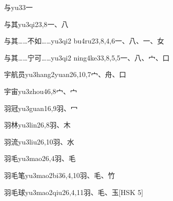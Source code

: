 \begin{entry}{与}{yu3}{3}{⼀}
\end{entry}

\begin{entry}{与其}{yu3qi2}{3,8}{⼀、⼋}
\end{entry}

\begin{entry}{与其……不如……}{yu3qi2 bu4ru2}{3,8,4,6}{⼀、⼋、⼀、⼥}
\end{entry}

\begin{entry}{与其……宁可……}{yu3qi2 ning4ke3}{3,8,5,5}{⼀、⼋、⼧、⼝}
\end{entry}

\begin{entry}{宇航员}{yu3hang2yuan2}{6,10,7}{⼧、⾈、⼝}
\end{entry}

\begin{entry}{宇宙}{yu3zhou4}{6,8}{⼧、⼧}
\end{entry}

\begin{entry}{羽冠}{yu3guan1}{6,9}{⽻、⼍}
\end{entry}

\begin{entry}{羽林}{yu3lin2}{6,8}{⽻、⽊}
\end{entry}

\begin{entry}{羽流}{yu3liu2}{6,10}{⽻、⽔}
\end{entry}

\begin{entry}{羽毛}{yu3mao2}{6,4}{⽻、⽑}
\end{entry}

\begin{entry}{羽毛笔}{yu3mao2bi3}{6,4,10}{⽻、⽑、⽵}
\end{entry}

\begin{entry}{羽毛球}{yu3mao2qiu2}{6,4,11}{⽻、⽑、⽟}[HSK 5]
\end{entry}

